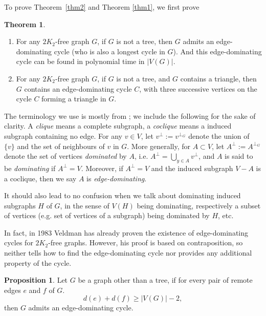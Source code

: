 \documentclass{amsart}
\theoremstyle{definition}
\newtheorem{theorem}{Theorem}
\newtheorem{proposition}{Proposition}
\begin{document}
To prove Theorem~\ref{thm2} and Theorem \ref{thm1}, we first prove




\begin{theorem}\label{addgen1} 
~
\begin{enumerate}
\item For any $2K_2$-free graph $G$, if $G$ is not a tree, then $G$ admits an edge-dominating cycle (who is also a longest cycle in $G$). And this edge-dominating cycle can be found in polynomial time in $|V(G)|$.
\item For any $2K_2$-free graph $G$, if $G$ is not a tree, and $G$ contains a triangle, then $G$ contains an edge-dominating cycle $C$, with three successive vertices on the cycle $C$ forming a triangle in $G$. 
\end{enumerate}
\end{theorem}










The terminology we use is  mostly from \cite{bomu08}; we include the following for the sake of
clarity.  
A {\em clique} means a complete subgraph, a {\em coclique} means a
induced subgraph containing no edge. 
For any
$v\in V$, let $v^\perp:=v^{\perp_G}$ denote the union of $\{v\}$ and the set of
neighbours of $v$ in $G$.  More generally, for $A\subset V$, let
$A^\perp:=A^{\perp_G}$ denote the set of vertices {\em dominated} by $A$, i.e.
$A^\perp=\bigcup\limits_{y\in A}v^\perp$, and $A$ is said to be {\em
dominating} if $A^\perp=V$.
Moreover, if $A^{\perp}=V$ and the induced subgraph $V-A$ is a coclique, then we say $A$ is {\em edge-dominating}. 
 
It should also lead to no confusion when we talk
about  dominating induced subgraphs $H$ of $G$, in the sense of $V(H)$ being
dominating, respectively a subset of vertices (e.g. set of vertices of a
subgraph) being dominated by $H$, etc.

In fact, in 1983 Veldman \cite{veldman83} has already proven the existence of edge-dominating cycles for $2K_2$-free graphs. However, his proof is based on contraposition, so neither tells how to find the edge-dominating cycle nor provides any additional property of the cycle.
\begin{proposition}\label{veldman2}{\cite[Theorem 2]{veldman83}}
Let $G$ be a graph other than a tree, if for every pair of remote edges $e$ and $f$ of $G$.
$$d(e)+d(f)\ge|V(G)|-2,$$
then $G$ admits an edge-dominating cycle.
\end{proposition}
\end{document}
